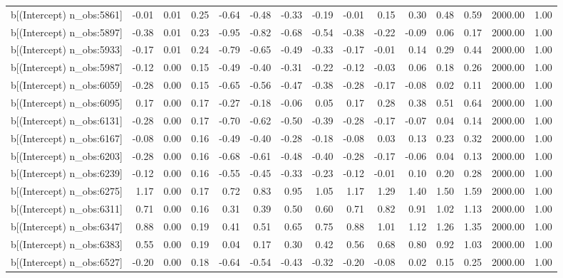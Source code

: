 \begin{table}[ht]
\begin{tabular}{rrrrrrrrrrrrrrr}
  b[(Intercept) n\_obs:5861] & -0.01 & 0.01 & 0.25 & -0.64 & -0.48 & -0.33 & -0.19 & -0.01 & 0.15 & 0.30 & 0.48 & 0.59 & 2000.00 & 1.00 \\ 
  b[(Intercept) n\_obs:5897] & -0.38 & 0.01 & 0.23 & -0.95 & -0.82 & -0.68 & -0.54 & -0.38 & -0.22 & -0.09 & 0.06 & 0.17 & 2000.00 & 1.00 \\ 
  b[(Intercept) n\_obs:5933] & -0.17 & 0.01 & 0.24 & -0.79 & -0.65 & -0.49 & -0.33 & -0.17 & -0.01 & 0.14 & 0.29 & 0.44 & 2000.00 & 1.00 \\ 
  b[(Intercept) n\_obs:5987] & -0.12 & 0.00 & 0.15 & -0.49 & -0.40 & -0.31 & -0.22 & -0.12 & -0.03 & 0.06 & 0.18 & 0.26 & 2000.00 & 1.00 \\ 
  b[(Intercept) n\_obs:6059] & -0.28 & 0.00 & 0.15 & -0.65 & -0.56 & -0.47 & -0.38 & -0.28 & -0.17 & -0.08 & 0.02 & 0.11 & 2000.00 & 1.00 \\ 
  b[(Intercept) n\_obs:6095] & 0.17 & 0.00 & 0.17 & -0.27 & -0.18 & -0.06 & 0.05 & 0.17 & 0.28 & 0.38 & 0.51 & 0.64 & 2000.00 & 1.00 \\ 
  b[(Intercept) n\_obs:6131] & -0.28 & 0.00 & 0.17 & -0.70 & -0.62 & -0.50 & -0.39 & -0.28 & -0.17 & -0.07 & 0.04 & 0.14 & 2000.00 & 1.00 \\ 
  b[(Intercept) n\_obs:6167] & -0.08 & 0.00 & 0.16 & -0.49 & -0.40 & -0.28 & -0.18 & -0.08 & 0.03 & 0.13 & 0.23 & 0.32 & 2000.00 & 1.00 \\ 
  b[(Intercept) n\_obs:6203] & -0.28 & 0.00 & 0.16 & -0.68 & -0.61 & -0.48 & -0.40 & -0.28 & -0.17 & -0.06 & 0.04 & 0.13 & 2000.00 & 1.00 \\ 
  b[(Intercept) n\_obs:6239] & -0.12 & 0.00 & 0.16 & -0.55 & -0.45 & -0.33 & -0.23 & -0.12 & -0.01 & 0.10 & 0.20 & 0.28 & 2000.00 & 1.00 \\ 
  b[(Intercept) n\_obs:6275] & 1.17 & 0.00 & 0.17 & 0.72 & 0.83 & 0.95 & 1.05 & 1.17 & 1.29 & 1.40 & 1.50 & 1.59 & 2000.00 & 1.00 \\ 
  b[(Intercept) n\_obs:6311] & 0.71 & 0.00 & 0.16 & 0.31 & 0.39 & 0.50 & 0.60 & 0.71 & 0.82 & 0.91 & 1.02 & 1.13 & 2000.00 & 1.00 \\ 
  b[(Intercept) n\_obs:6347] & 0.88 & 0.00 & 0.19 & 0.41 & 0.51 & 0.65 & 0.75 & 0.88 & 1.01 & 1.12 & 1.26 & 1.35 & 2000.00 & 1.00 \\ 
  b[(Intercept) n\_obs:6383] & 0.55 & 0.00 & 0.19 & 0.04 & 0.17 & 0.30 & 0.42 & 0.56 & 0.68 & 0.80 & 0.92 & 1.03 & 2000.00 & 1.00 \\ 
  b[(Intercept) n\_obs:6527] & -0.20 & 0.00 & 0.18 & -0.64 & -0.54 & -0.43 & -0.32 & -0.20 & -0.08 & 0.02 & 0.15 & 0.25 & 2000.00 & 1.00 \\ 

\end{tabular}
\end{table}
